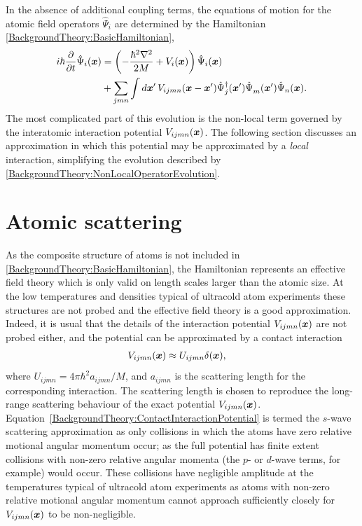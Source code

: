 In the absence of additional coupling terms, the equations of motion for the atomic field operators $\hat{\Psi}_i$ are determined by the Hamiltonian \eqref{BackgroundTheory:BasicHamiltonian},
\begin{align}
    \begin{split}
    i \hbar \frac{\partial}{\partial t}\hat{\Psi}_i(\vect{x}) &= \left( - \frac{\hbar^2 \nabla^2}{2 M}  + V_i(\vect{x}) \right) \hat{\Psi}_i(\vect{x}) \\
        &+ \sum_{jmn} \int d \vect{x}'\, V_{ijmn}(\vect{x} - \vect{x}') \hat{\Psi}_j^\dagger(\vect{x}') \hat{\Psi}_m^{\phantom{\dagger}}(\vect{x}') \hat{\Psi}_n(\vect{x}).
    \end{split}\label{BackgroundTheory:NonLocalOperatorEvolution}
\end{align}
The most complicated part of this evolution is the non-local term governed by the interatomic interaction potential $V_{ijmn}(\bm{x})$.  The following section discusses an approximation in which this potential may be approximated by a \emph{local} interaction, simplifying the evolution described by \eqref{BackgroundTheory:NonLocalOperatorEvolution}.

\section{Atomic scattering}
\label{BackgroundTheory:AtomicScattering}

As the composite structure of atoms is not included in \eqref{BackgroundTheory:BasicHamiltonian}, the Hamiltonian represents an effective field theory which is only valid on length scales larger than the atomic size.  At the low temperatures and densities typical of ultracold atom experiments these structures are not probed and the effective field theory is a good approximation.  Indeed, it is usual that the details of the interaction potential $V_{ijmn}(\bm{x})$ are not probed either, and the potential can be approximated by a contact interaction \citep{Leggett:2001}
\begin{align}
    V_{ijmn}(\vect{x}) &\approx U_{ijmn} \delta(\vect{x}), \label{BackgroundTheory:ContactInteractionPotential}
\end{align}
where $U_{ijmn} = 4 \pi \hbar^2 a_{ijmn}/M$, and $a_{ijmn}$ is the scattering length for the corresponding interaction.  The scattering length is chosen to reproduce the long-range scattering behaviour of the exact potential $V_{ijmn}(\bm{x})$.  Equation~\eqref{BackgroundTheory:ContactInteractionPotential} is termed the $s$-wave scattering approximation as only collisions in which the atoms have zero relative motional angular momentum occur; as the full potential has finite extent collisions with non-zero relative angular momenta (the $p$- or $d$-wave terms, for example) would occur.  These collisions have negligible amplitude at the temperatures typical of ultracold atom experiments as atoms with non-zero relative motional angular momentum cannot approach sufficiently closely for $V_{ijmn}(\bm{x})$ to be non-negligible.

